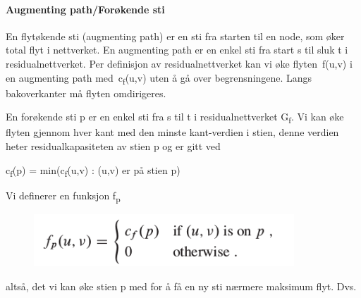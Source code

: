\documentclass[12pt]{report}
\begin{document}
\par

\paragraph*{Augmenting path/Forøkende sti}
\setlength{\parskip}{0.0pt}
En flytøkende sti (augmenting path) er en sti fra starten til en node, som øker total flyt i nettverket. En augmenting path er en enkel sti fra start s til sluk t i residualnettverket. Per definisjon av residualnettverket kan vi øke flyten f(u,v) i en augmenting path med c\textsubscript{f}(u,v) uten å gå over begrensningene. Langs bakoverkanter må flyten omdirigeres.\par

En forøkende sti p er en enkel sti fra s til t i residualnettverket G\textsubscript{f}. Vi kan øke flyten gjennom hver kant med den minste kant-verdien i stien, denne verdien heter residualkapasiteten av stien p og er gitt ved\par

\begin{Center}
c\textsubscript{f}(p) = min(c\textsubscript{f}(u,v) : (u,v) er på stien p) 
\end{Center}\par

Vi definerer en funksjon f\textsubscript{p}\par




\begin{figure}[H]
	\begin{Center}
		\includegraphics[width=3.84in,height=0.78in]{./media/image144.png}
	\end{Center}
\end{figure}



\par

altså, det vi kan øke stien p med for å få en ny sti nærmere maksimum flyt. Dvs.\par
\end{document}
